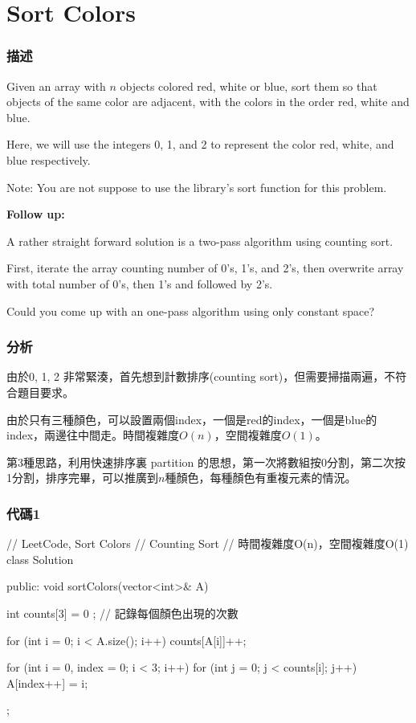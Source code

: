 \section{Sort Colors} %
\label{sec:sort-colors}


\subsubsection{描述}
Given an array with $n$ objects colored red, white or blue, sort them so that objects of the same color are adjacent, with the colors in the order red, white and blue.

Here, we will use the integers 0, 1, and 2 to represent the color red, white, and blue respectively.

Note:
You are not suppose to use the library's sort function for this problem.

\textbf{Follow up:}

A rather straight forward solution is a two-pass algorithm using counting sort.

First, iterate the array counting number of 0's, 1's, and 2's, then overwrite array with total number of 0's, then 1's and followed by 2's.

Could you come up with an one-pass algorithm using only constant space?


\subsubsection{分析}
由於0, 1, 2 非常緊湊，首先想到計數排序(counting sort)，但需要掃描兩遍，不符合題目要求。

由於只有三種顏色，可以設置兩個index，一個是red的index，一個是blue的index，兩邊往中間走。時間複雜度$O(n)$，空間複雜度$O(1)$。

第3種思路，利用快速排序裏 partition 的思想，第一次將數組按0分割，第二次按1分割，排序完畢，可以推廣到$n$種顏色，每種顏色有重複元素的情況。


\subsubsection{代碼1}
\begin{Code}
// LeetCode, Sort Colors
// Counting Sort
// 時間複雜度O(n)，空間複雜度O(1)
class Solution {
public:
    void sortColors(vector<int>& A) {
        int counts[3] = { 0 }; // 記錄每個顏色出現的次數

        for (int i = 0; i < A.size(); i++)
            counts[A[i]]++;

        for (int i = 0, index = 0; i < 3; i++)
            for (int j = 0; j < counts[i]; j++)
                A[index++] = i;

    }
};
\end{Code}


